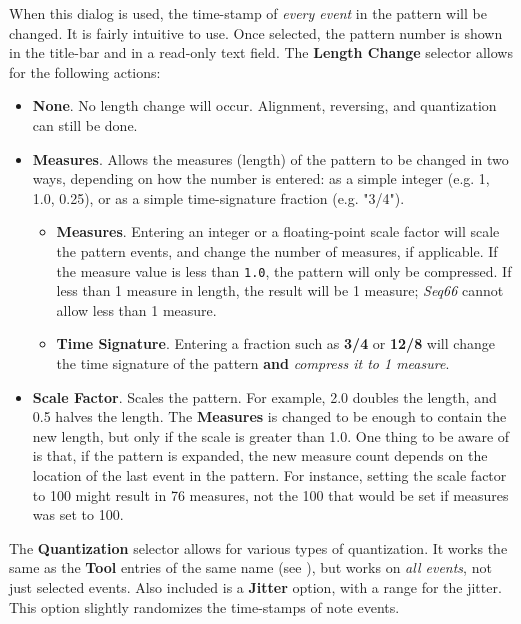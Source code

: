    When this dialog is used, the time-stamp of \textsl{every event} in the
   pattern will be changed.
   It is fairly intuitive to use.
   Once selected, the pattern number is shown in the title-bar and in a
   read-only text field.
   The \textbf{Length Change} selector allows for the following actions:

   \begin{itemize}
      \item \textbf{None}.
         No length change will occur.
         Alignment, reversing, and quantization can still be done.
      \item \textbf{Measures}.
         Allows the measures (length) of the pattern to be changed in two ways,
         depending on how the number is entered: as a simple integer (e.g.
         1, 1.0, 0.25),
         or as a simple time-signature fraction (e.g. "3/4").
         \begin{itemize}
            \item \textbf{Measures}.
               Entering an integer or a floating-point scale factor will scale
               the pattern events,
               and change the number of measures, if applicable.
               If the measure value is less than \texttt{1.0},
               the pattern will only be compressed.
               If less than 1 measure in length, the result will be
               1 measure; \textsl{Seq66} cannot allow less than 1 measure.
            \item \textbf{Time Signature}.
               Entering a fraction such as \textbf{3/4} or
               \textbf{12/8} will change the time signature of the pattern
               \textbf{and} \textsl{compress it to 1 measure}.
         \end{itemize}
      \item \textbf{Scale Factor}.
         Scales the pattern.  For example, 2.0 doubles the length, and 0.5
         halves the length.
         The \textbf{Measures} is changed to be enough to contain the new length,
         but only if the scale is greater than 1.0.
         One thing to be aware of is that, if the pattern is expanded, the
         new measure count depends on the location of the last event in the
         pattern. For instance, setting the scale factor to 100 might result in
         76 measures, not the 100 that would be set if measures was set to 100.
   \end{itemize}

   The \textbf{Quantization} selector allows for various types of
   quantization.
   It works the same as the \textbf{Tool} entries of the
   same name (see ),
   but works on \textsl{all events}, not just selected events.
   Also included is a \textbf{Jitter} option, with a range for the jitter.
   This option slightly randomizes the time-stamps of note events.

